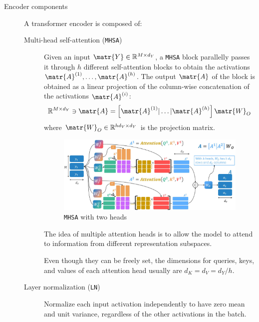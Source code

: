 \begin{description}
    \item[Encoder components]
        A transformer encoder is composed of:

        \begin{description}
            \item[Multi-head self-attention (\texttt{MHSA})] 
                Given an input $\matr{Y} \in \mathbb{R}^{M \times d_Y}$, a \texttt{MHSA} block parallelly passes it through $h$ different self-attention blocks to obtain the activations $\matr{A}^{(1)}, \dots, \matr{A}^{(h)}$. The output $\matr{A}$ of the block is obtained as a linear projection of the column-wise concatenation of the activations $\matr{A}^{(i)}$:
                \[ \mathbb{R}^{M \times d_Y} \ni \matr{A} = \left[ \matr{A}^{(1)} \vert \dots \vert \matr{A}^{(h)} \right] \matr{W}_O \]
                where $\matr{W}_O \in \mathbb{R}^{hd_V \times d_Y}$ is the projection matrix.

                \begin{figure}[H]
                    \centering
                    \includegraphics[width=0.7\linewidth]{./img/_multi_head_attention.jpg}
                    \caption{\texttt{MHSA} with two heads}
                \end{figure}

                \begin{remark}
                    The idea of multiple attention heads is to allow the model to attend to information from different representation subspaces.
                \end{remark}

                \begin{remark}
                    Even though they can be freely set, the dimensions for queries, keys, and values of each attention head usually are $d_K = d_V = d_Y/h$.
                \end{remark}

            \item[Layer normalization (\texttt{LN})] 
                Normalize each input activation independently to have zero mean and unit variance, regardless of the other activations in the batch.


\end{description}
\end{description}
